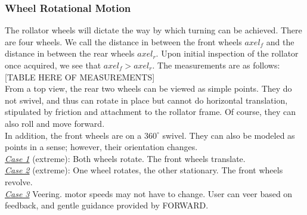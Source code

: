 \subsubsection{Wheel Rotational Motion}
\noindent The rollator wheels will dictate the way by which turning can be achieved. There are four wheels. We call the distance in between the front wheels $axel_f$ and the distance in between the rear wheels $axel_r$. Upon initial inspection of the rollator once acquired, we see that $axel_f > axel_r$. The measurements are as follows:\\

[TABLE HERE OF MEASUREMENTS]\\

\noindent From a top view, the rear two wheels can be viewed as simple points. They do not swivel, and thus can rotate in place but cannot do horizontal translation, stipulated by friction and attachment to the rollator frame. Of course, they can also roll and move forward.\\

\noindent In addition, the front wheels are on a $360^{\circ}$ swivel. They can also be modeled as points in a sense; however, their orientation changes.\\

\noindent \underline{\textit{Case 1}} (extreme): Both wheels rotate. The front wheels translate.\\

\noindent \underline{\textit{Case 2}} (extreme): One wheel rotates, the other stationary. The front wheels revolve.\\

\noindent \underline{\textit{Case 3}} Veering. motor speeds may not have to change. User can veer based on feedback, and gentle guidance provided by FORWARD.\\

